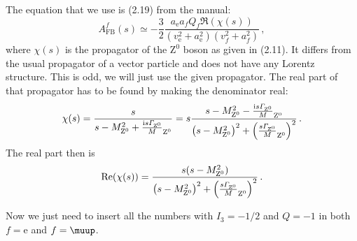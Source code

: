 \documentclass[11pt, english, fleqn, DIV=15, headinclude, BCOR=2cm]{scrreprt}
\newcommand\MZ{M_{\mathrm Z^0}}
\begin{document}
The equation that we use is (2.19) from the manual:
\[
    A_\text{FB}^f(s) \simeq - \frac 32 \frac{a_\mathrm e a_f Q_f \Re(\chi(s))}{(v_\mathrm e^2
    + a_\mathrm e^2)(v_f^2 + a_f^2)} \,,
\]
where $\chi(s)$ is the propagator of the $\mathrm Z^0$ boson as given in
(2.11). It differs from the usual propagator of a vector particle and does not
have any Lorentz structure. This is odd, we will just use the given propagator.
The real part of that propagator has to be found by making the denominator
real:
\[
    \chi(s)
    = \frac{s}{s - \MZ^2 + \frac{\iup s \Gamma_{\mathrm Z^0}}\MZ}
    = s \frac{s - \MZ^2 - \frac{\iup s \Gamma_{\mathrm Z^0}}\MZ}
    {\del{s - \MZ^2}^2 + \del{\frac{s \Gamma_{\mathrm Z^0}}\MZ}^2} \,.
\]
The real part then is
\[
    \Re(\chi(s))
    = \frac{s(s - \MZ^2)}
    {\del{s - \MZ^2}^2 + \del{\frac{s \Gamma_{\mathrm Z^0}}\MZ}^2} \,.
\]

Now we just need to insert all the numbers with $I_3 = -1/2$ and $Q = -1$ in
both $f = \mathrm e$ and $f = \muup$.

\end{document}
